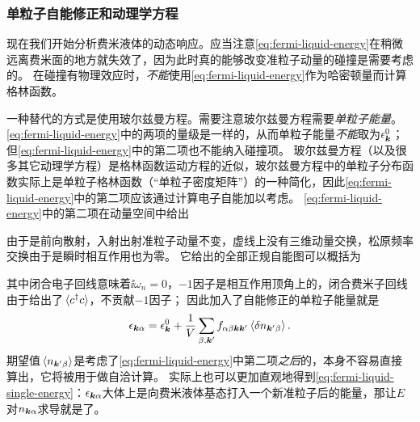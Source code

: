 \subsubsection{单粒子自能修正和动理学方程}

现在我们开始分析费米液体的动态响应。应当注意\eqref{eq:fermi-liquid-energy}在稍微远离费米面的地方就失效了，因为此时真的能够改变准粒子动量的碰撞是需要考虑的。
在碰撞有物理效应时，\emph{不能}使用\eqref{eq:fermi-liquid-energy}作为哈密顿量而计算格林函数。

一种替代的方式是使用玻尔兹曼方程。需要注意玻尔兹曼方程需要\emph{单粒子能量}。\eqref{eq:fermi-liquid-energy}中的两项的量级是一样的，从而单粒子能量\emph{不能}取为$\epsilon_{\vb*{k}}^0$；但\eqref{eq:fermi-liquid-energy}中的第二项也不能纳入碰撞项。
玻尔兹曼方程（以及很多其它动理学方程）是格林函数运动方程的近似，玻尔兹曼方程中的单粒子分布函数实际上是单粒子格林函数（“单粒子密度矩阵”）的一种简化，因此\eqref{eq:fermi-liquid-energy}中的第二项应该通过计算电子自能加以考虑。
\eqref{eq:fermi-liquid-energy}中的第二项在动量空间中给出

由于是前向散射，入射出射准粒子动量不变，虚线上没有三维动量交换，松原频率交换由于是瞬时相互作用也为零。
它给出的全部正规自能图可以概括为

其中闭合电子回线意味着$\ii \omega_n = 0$，$-1$因子是相互作用顶角上的，闭合费米子回线由于给出了$\expval*{c^\dagger c}$，不贡献$-1$因子；
因此加入了自能修正的单粒子能量就是
\begin{equation}
    \epsilon_{\vb*{k} \alpha} = \epsilon_{\vb*{k}}^0 + \frac{1}{V} \sum_{\beta, \vb*{k}'} f_{\alpha \beta \vb*{k} \vb*{k}'} \expval*{\var{n_{\vb*{k}' \beta}}}.
    \label{eq:fermi-liquid-single-energy}
\end{equation}
期望值$\expval*{n_{\vb*{k}' \beta}}$是考虑了\eqref{eq:fermi-liquid-energy}中第二项\emph{之后}的，本身不容易直接算出，它将被用于做自洽计算。
实际上也可以更加直观地得到\eqref{eq:fermi-liquid-single-energy}：$\epsilon_{\vb*{k} \alpha}$大体上是向费米液体基态打入一个新准粒子后的能量，那让$E$对$n_{\vb*{k} \alpha}$求导就是了。

